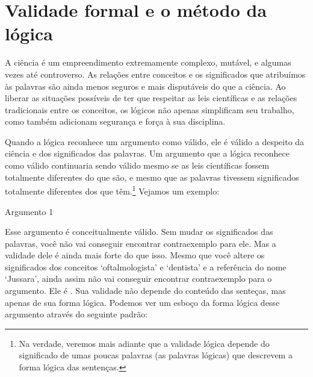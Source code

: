 \section{Validade formal e o método da lógica}
A ciência é um empreendimento extremamente complexo, mutável, e algumas vezes até controverso. As relações entre conceitos e os significados que atribuímos às palavras são ainda menos seguros e mais disputáveis do que a ciência.
Ao liberar as situações possíveis de ter que respeitar as leis científicas e as relações tradicionais entre os conceitos, os lógicos não apenas simplificam seu trabalho, como também adicionam segurança e força à sua disciplina.

Quando a lógica reconhece um argumento como válido, ele é válido a despeito da ciência e dos significados das palavras.
Um argumento que a lógica reconhece como válido continuaria sendo válido mesmo se as leis científicas fossem totalmente diferentes do que são, e mesmo que as palavras tivessem significados totalmente diferentes dos que têm.\footnote{
	Na verdade, veremos mais adiante que a validade lógica depende do significado de umas poucas palavras (as palavras lógicas) que descrevem a forma lógica das sentenças.}
Vejamos um exemplo:
\begin{description}
\item[Argumento 1]
\end{description}
Esse argumento é conceitualmente válido.
Sem mudar os significados das palavras, você não vai conseguir encontrar contraexemplo para ele.
Mas a validade dele é ainda mais forte do que isso.
Mesmo que você altere os significados dos conceitos `oftalmologista' e `dentista' e a referência do nome `Jussara', ainda assim não vai conseguir encontrar contraexemplo para o argumento.
Ele é .
Sua validade não depende do conteúdo das senteças, mas apenas de sua forma lógica.
Podemos ver um esboço da forma lógica desse argumento através do seguinte padrão:



